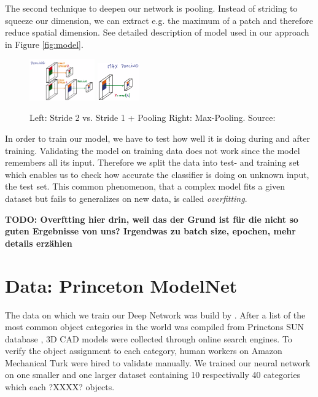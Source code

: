 \documentclass[10pt,twocolumn,letterpaper]{article}
\begin{document}
The second technique to deepen our network is pooling. Instead of striding to squeeze our dimension, we can extract e.g. the maximum of a patch and therefore reduce spatial dimension. 
See detailed description of model used in our approach in Figure \ref{fig:model}.

\begin{figure}[h]
	\label{fig:pooling}
	\includegraphics[width=0.25\textwidth]{figures/con_max}
	\includegraphics[width=0.16\textwidth]{figures/max}
	\caption{Left: Stride 2 vs. Stride 1 + Pooling \quad Right: Max-Pooling. Source: \cite{udacity}}
\end{figure}

In order to train our model, we have to test how well it is doing during and after training. 
Validating the model on training data does not work since the model remembers all its input. Therefore we split the data into test- and training set which enables us to check how accurate the classifier is doing on unknown input, the test set. This common phenomenon, that a complex model fits a given dataset but fails to generalizes on new data, is called \textit{overfitting}.

\textbf{TODO: Overftting hier drin, weil das der Grund ist für die nicht so guten Ergebnisse von uns?
Irgendwas zu batch size, epochen, mehr details erzählen}

\section{Data: Princeton ModelNet}

The data on which we train our Deep Network was build by \cite{shape}. After a list of the most
common object categories in the world was compiled from Princtons SUN database \cite{sun}, 3D CAD models were collected through online 
search engines. To verify the object assignment to each category, human workers on Amazon Mechanical Turk were hired to validate manually. We trained our neural network on one smaller and one larger dataset containing 10 respectivally 40 categories which each ?XXXX? objects.
\end{document}

